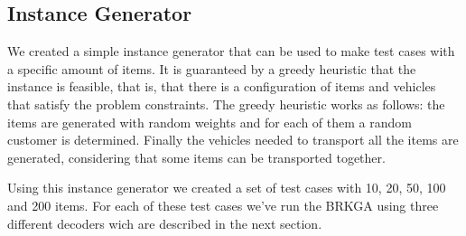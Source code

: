 \subsection{Instance Generator}
\label{sec:instance-generator}



We created a simple instance generator that can be used to make test cases with a specific amount of items.
It is guaranteed by a greedy heuristic that the instance is feasible, that is, that there is a configuration of items and vehicles
that satisfy the problem constraints. The greedy heuristic works as follows: the items are generated with random weights
and for each of them a random customer is determined. Finally the vehicles needed to transport all the items are generated,
considering that some items can be transported together.

Using this instance generator we created a set of test cases with 10, 20, 50, 100 and 200 items. For each of these test cases
we've run the BRKGA using three different decoders wich are described in the next section.